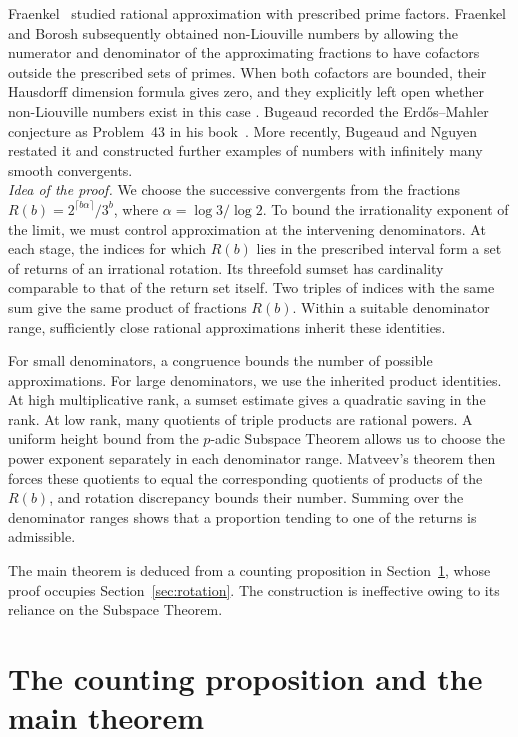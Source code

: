 \documentclass[11pt,reqno]{amsart}
\theoremstyle{definition}
\theoremstyle{plain}
\theoremstyle{definition}
\theoremstyle{remark}
\begin{document}
Fraenkel~\cite{Fraenkel62,Fraenkel} studied rational approximation
with prescribed prime factors. Fraenkel and Borosh subsequently
obtained non-Liouville numbers by allowing the numerator and
denominator of the approximating fractions to have cofactors outside
the prescribed sets of primes. When both cofactors are bounded, their
Hausdorff dimension formula gives zero, and they explicitly left open
whether non-Liouville numbers exist in this case
\cite[p.~459]{FraenkelBorosh}. Bugeaud recorded the Erd\H{o}s--Mahler
conjecture as Problem~43 in his book~\cite[p.~215]{Bugeaud}.
More recently, Bugeaud and Nguyen~\cite[Question~4.1, p.~32]{BN}
restated it and constructed further examples of numbers with
infinitely many smooth convergents.\\

\noindent\emph{Idea of the proof.}
We choose the successive convergents from the fractions
$R(b)=2^{\lceil b\alpha\rceil}/3^b$, where $\alpha=\log 3/\log 2$.
To bound the irrationality exponent of the limit, we must control
approximation at the intervening denominators. At each stage, the
indices for which $R(b)$ lies in the prescribed interval form a set
of returns of an irrational rotation. Its threefold sumset has
cardinality comparable to that of the return set itself. Two triples
of indices with the same sum give the same product of fractions
$R(b)$. Within a suitable denominator range, sufficiently close
rational approximations inherit these identities.

For small denominators, a congruence bounds the number of possible
approximations. For large denominators, we use the inherited product
identities. At high multiplicative rank, a sumset estimate gives a
quadratic saving in the rank. At low rank, many quotients of triple
products are rational powers. A uniform height bound from the
$p$-adic Subspace Theorem allows us to choose the power exponent
separately in each denominator range. Matveev's theorem then forces
these quotients to equal the corresponding quotients of products of
the $R(b)$, and rotation discrepancy bounds their number. Summing
over the denominator ranges shows that a proportion tending to one
of the returns is admissible.

The main theorem is deduced from a counting proposition in
Section~\ref{sec:prelim}, whose proof occupies
Section~\ref{sec:rotation}. The construction is ineffective
owing to its reliance on the Subspace Theorem.

\section{The counting proposition and the main theorem}
\label{sec:prelim}
\end{document}
